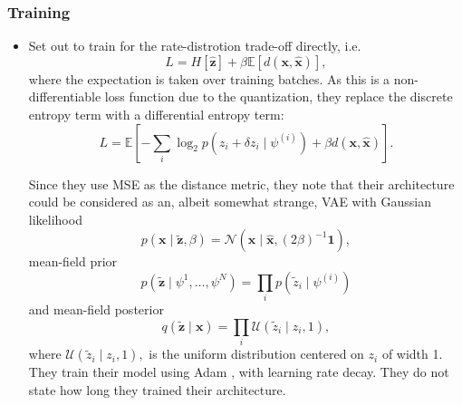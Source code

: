 \documentclass{article}
\renewcommand{\vec}[1]{\mathbf{#1}}
\newcommand{\Exp}{\mathbb{E}}
\newcommand{\Norm}{\mathcal{N}}
\newcommand{\Unif}{\mathcal{U}}
\begin{document}
\subsubsection{Training}
\par
\begin{itemize}
\item \cite{balle2016end} Set out to train for the rate-distrotion trade-off
  directly, i.e.
  \[
    L = H[\vec{\hat{z}}] + \beta \Exp[d(\vec{x}, \vec{\hat{x}})],
  \]
  where the expectation is taken over training batches.
  As this is a non-differentiable loss function due to the quantization, they
  replace the discrete entropy term with a differential entropy term:
  \[
   L = \Exp\left[ -\sum_i \log_2 p(z_i + \delta z_i \mid \psi^{(i)}) +
                     \beta d(\vec{x}, \vec{\hat{x}})\right].
  \]
  \par Since they use MSE as the distance metric, they note that their
  architecture could be considered as an, albeit somewhat
  strange, VAE with Gaussian likelihood
  \[
    p(\vec{x} \mid \vec{\tilde{z}}, \beta) =
    \Norm(\vec{x} \mid \vec{\hat{x}}, (2\beta)^{-1}\vec{1}),
  \]
  mean-field prior
  \[
    p(\vec{\tilde{z}} \mid \psi^{1}, \hdots, \psi^{N}) =
    \prod_i p(\tilde{z}_i \mid \psi^{(i)})
  \]
  and mean-field posterior
  \[
    q(\vec{\tilde{z}} \mid \vec{x}) =
    \prod_i \Unif(\tilde{z}_i \mid z_i, 1),
  \]
  where $\Unif(\tilde{z}_i \mid z_i, 1),$ is the uniform distribution centered
  on $z_i$ of width 1. They train their model using Adam \cite{kingma2014adam},
  with learning rate decay. They do not state how long they trained their
  architecture.
  

\end{itemize}
\end{document}
